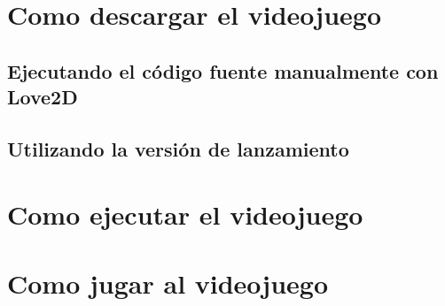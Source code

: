 \documentclass[12pt, spanish]{article}
\begin{document}
\section{Como descargar el videojuego}

\subsection{Ejecutando el código fuente manualmente con Love2D}

\subsection{Utilizando la versión de lanzamiento}


\section{Como ejecutar el videojuego}

\section{Como jugar al videojuego}
\end{document}
